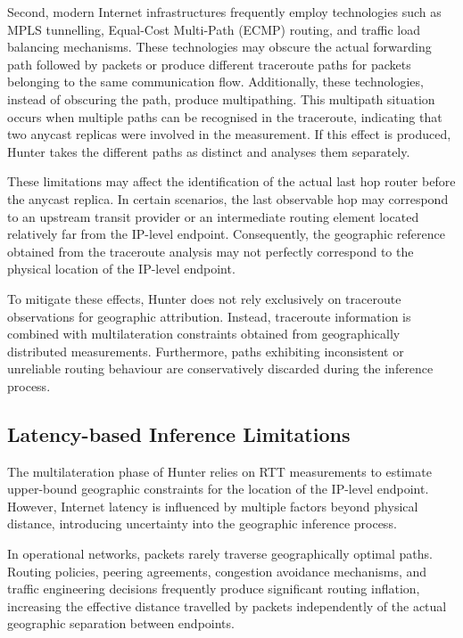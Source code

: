 Second, modern Internet infrastructures frequently employ technologies such as MPLS tunnelling, Equal-Cost Multi-Path (ECMP) routing, and traffic load balancing mechanisms. These technologies may obscure the actual forwarding path followed by packets or produce different traceroute paths for packets belonging to the same communication flow. Additionally, these technologies, instead of obscuring the path, produce multipathing. This multipath situation occurs when multiple paths can be recognised in the traceroute, indicating that two anycast replicas were involved in the measurement. If this effect is produced, Hunter takes the different paths as distinct and analyses them separately.

These limitations may affect the identification of the actual last hop router before the anycast replica. In certain scenarios, the last observable hop may correspond to an upstream transit provider or an intermediate routing element located relatively far from the IP-level endpoint. Consequently, the geographic reference obtained from the traceroute analysis may not perfectly correspond to the physical location of the IP-level endpoint.

To mitigate these effects, Hunter does not rely exclusively on traceroute observations for geographic attribution. Instead, traceroute information is combined with multilateration constraints obtained from geographically distributed measurements. Furthermore, paths exhibiting inconsistent or unreliable routing behaviour are conservatively discarded during the inference process.

\subsection{Latency-based Inference Limitations}
\label{sc:hunter_limitations_latency_inference}

The multilateration phase of Hunter relies on RTT measurements to estimate upper-bound geographic constraints for the location of the IP-level endpoint. However, Internet latency is influenced by multiple factors beyond physical distance, introducing uncertainty into the geographic inference process.

In operational networks, packets rarely traverse geographically optimal paths. Routing policies, peering agreements, congestion avoidance mechanisms, and traffic engineering decisions frequently produce significant routing inflation, increasing the effective distance travelled by packets independently of the actual geographic separation between endpoints.

